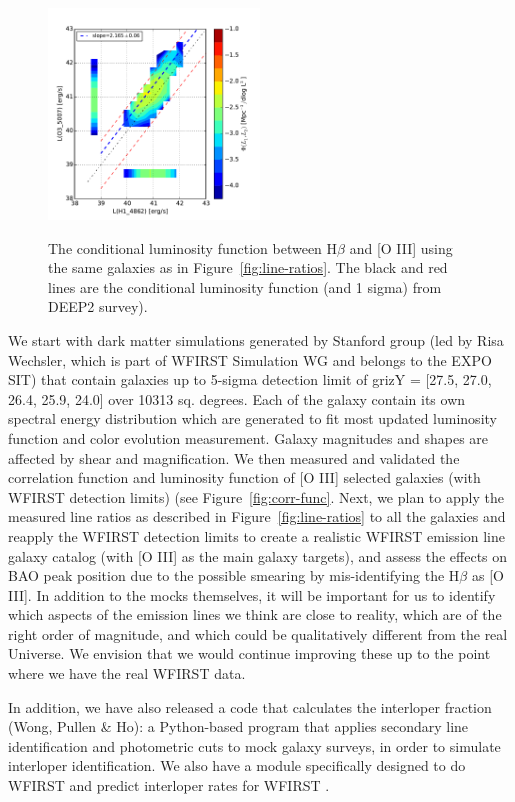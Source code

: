  \begin{figure}
  \includegraphics[width = 0.5\textwidth]{Plots/cond_lum.pdf}
 \label{fig:cond-lum}
  \caption{The conditional luminosity function between H$\beta$ and [O III] using the same galaxies as in Figure~\ref{fig:line-ratios}.  The black and red lines are the conditional luminosity function (and 1 sigma) from DEEP2 survey).
 }
 \end{figure}

 We start with dark matter simulations generated by Stanford group (led by Risa
Wechsler, which is part of WFIRST Simulation WG and belongs to the EXPO SIT)
that contain galaxies up to 5-sigma detection limit of grizY = [27.5, 27.0,
26.4, 25.9, 24.0] over 10313 sq. degrees.  Each of the galaxy contain its own
spectral energy distribution which are generated to fit most updated luminosity
function and color evolution measurement. Galaxy magnitudes and shapes are
affected by shear and magnification. We then measured and validated the
correlation function and luminosity function of [O III] selected galaxies (with
WFIRST detection limits) (see Figure~\ref{fig:corr-func}. Next, we plan to apply
the measured line ratios as described in Figure~\ref{fig:line-ratios} to all the
galaxies and reapply the WFIRST detection limits to create a realistic WFIRST
emission line galaxy catalog (with  [O III] as the main galaxy targets), and
assess the effects on BAO peak position due to the possible smearing by
mis-identifying the H$\beta$ as [O III]. In addition to the mocks themselves, it
will be important for us to identify which aspects of the emission lines we
think are close to reality, which are of the right order of magnitude, and which
could be qualitatively different from the real Universe. We envision that we
would continue improving these up to the point where we have the real WFIRST
data.

 In addition, we have also released a code that calculates the interloper
 fraction (Wong, Pullen \& Ho): a Python-based program that applies secondary
 line identification and photometric cuts to mock galaxy surveys, in order to
 simulate interloper identification. We also have a module specifically designed
 to do WFIRST and predict interloper rates for WFIRST \citep{Wong:2016eku}.

